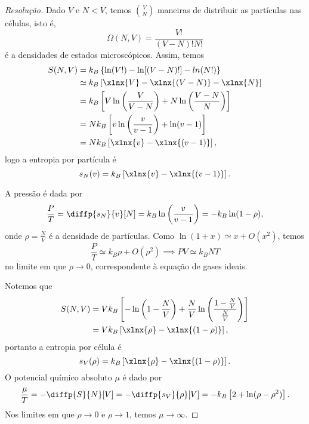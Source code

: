 \begin{proof}[Resolução]
    Dado \(V\) e \(N < V\), temos \(\binom{V}{N}\) maneiras de distribuir as partículas nas células, isto é,
    \begin{equation*}
        \Omega(N, V) = \frac{V!}{(V-N)!N!}
    \end{equation*}
    é a densidades de estados microscópicos. Assim, temos
    \begin{align*}
        S(N, V) &= k_B\left\{\ln(V!) - \ln[(V-N)!] - ln(N!)\right\}\\
                &\simeq k_B\left[\xlnx{V} - \xlnx{(V-N)} - \xlnx{N}\right]\\
                &= k_B \left[V \ln\left(\frac{V}{V-N}\right) + N \ln\left(\frac{V - N}{N}\right)\right]\\
                &= Nk_B \left[v \ln\left(\frac{v}{v - 1}\right) + \ln(v-1)\right]\\
                &= N k_B \left[\xlnx{v} - \xlnx{(v - 1)}\right],
    \end{align*}
    logo a entropia por partícula é
    \begin{equation*}
        s_N(v) = k_B\left[\xlnx{v} - \xlnx{(v - 1)}\right].
    \end{equation*}

    A pressão é dada por
    \begin{equation*}
        \frac{P}{T} = \diffp{s_N}{v}[N] = k_B \ln\left(\frac{v}{v - 1}\right) = -k_B \ln({1 - \rho}),
    \end{equation*}
    onde \(\rho = \frac{N}{V}\) é a densidade de partículas. Como \(\ln(1+x) \simeq x + O(x^2)\), temos
    \begin{equation*}
        \frac{P}{T} \simeq k_B \rho + O(\rho^2) \implies P V \simeq k_B N T
    \end{equation*}
    no limite em que \(\rho \to 0\), correspondente à equação de gases ideais.

    Notemos que
    \begin{align*}
        S(N, V) &= V k_B \left[-\ln\left(1 - \frac{N}{V}\right) + \frac{N}{V}\ln\left(\frac{1 - \frac{N}{V}}{\frac{N}{V}}\right)\right]\\
                &= V k_B\left[\xlnx{\rho} - \xlnx{(1 - \rho)}\right],
    \end{align*}
    portanto a entropia por célula é
    \begin{equation*}
        s_V(\rho) = k_B \left[\xlnx{\rho} - \xlnx{(1 - \rho)}\right].
    \end{equation*}
    O potencial químico absoluto \(\mu\) é dado por
    \begin{equation*}
        \frac{\mu}{T} = - \diffp{S}{N}[V] = - \diffp{s_V}{\rho}[V] = -k_B\left[2 + \ln(\rho - \rho^2)\right].
    \end{equation*}
    Nos limites em que \(\rho \to 0\) e \(\rho \to 1\), temos \(\mu \to \infty\).
\end{proof}
